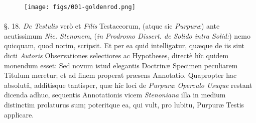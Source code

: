\documentclass[a4paper, 11pt, oneside, polutonikogreek, german]{article}
\begin{document}
\begin{figure}[H]
\centering
\texttt{[image: figs/001-goldenrod.png]}
\end{figure}
\paragraph{}
§. 18. \emph{De Testulis} verò et \emph{Filis} Testaceorum, (atque sic \emph{Purpuræ}) ante acutissimum \emph{Nic. Stenonem}, (\emph{in Prodromo Dissert. de Solido intra Solid:}) nemo quicquam, quod norim, scripsit. Et per ea quid intelligatur, quæque de iis sint dicti \emph{Autoris} Observationes selectiores ac Hypotheses, directè hîc quidem monendum esset: Sed novum istud elegantis Doctrinæ Specimen peculiarem Titulum meretur; et ad finem properat præsens Annotatio. Quapropter hac absolutâ, additisque tantisper, quæ hîc loci de \emph{Purpuræ Operculo Usuque} restant dicenda adhuc, sequentis Annotationis vicem \emph{Stenoniana} illa in medium distinctim prolaturus sum; poteritque ea, qui vult, pro lubitu, Purpuræ Testis applicare.
\end{document}
